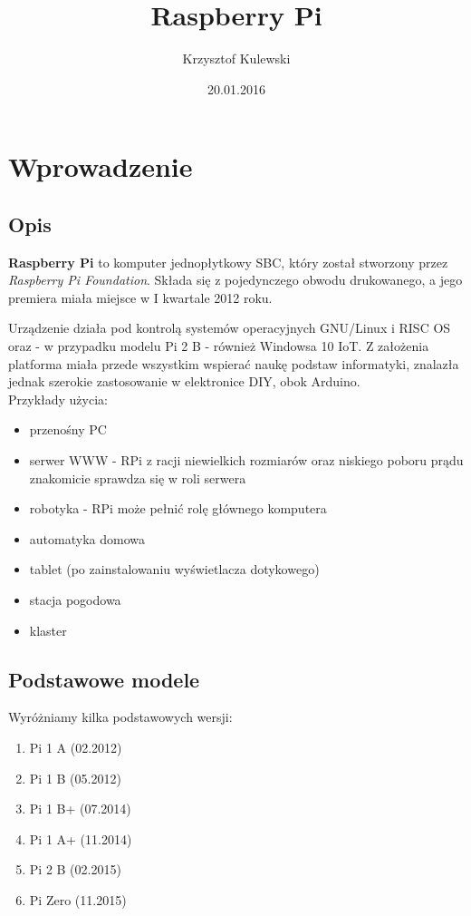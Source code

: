 \documentclass[titlepage]{article}
\author{Krzysztof Kulewski}
\title{Raspberry Pi}
\date{20.01.2016}
\begin{document}
\maketitle

\newpage

\tableofcontents

\newpage

\section{Wprowadzenie}
\subsection{Opis}
\textbf{Raspberry Pi} to komputer jednopłytkowy SBC, 
który został stworzony przez \textit{Raspberry Pi Foundation\cite{rpif}}.
Składa się z pojedynczego obwodu drukowanego, a jego premiera 
miała miejsce w I kwartale 2012 roku.

Urządzenie działa pod kontrolą systemów operacyjnych GNU/Linux i RISC OS oraz - w przypadku modelu Pi 2 B - również Windowsa 10 IoT.
Z założenia platforma miała przede wszystkim wspierać naukę 
podstaw informatyki, znalazła jednak szerokie zastosowanie w elektronice DIY, obok Arduino.
\\
Przykłady użycia:
\begin{itemize}
	\item przenośny PC
	\item serwer WWW - RPi z racji niewielkich rozmiarów oraz niskiego poboru prądu znakomicie sprawdza się w roli serwera
	\item robotyka - RPi może pełnić rolę głównego komputera
	\item automatyka domowa
	\item tablet (po zainstalowaniu wyświetlacza dotykowego)
	\item stacja pogodowa
	\item klaster
\end{itemize}
\subsection{Podstawowe modele}
Wyróżniamy kilka podstawowych wersji: 
\begin{enumerate}
	\item Pi 1 A (02.2012)
	\item Pi 1 B (05.2012)
	\item Pi 1 B+ (07.2014)
	\item Pi 1 A+ (11.2014)
	\item Pi 2 B (02.2015)
	\item Pi Zero (11.2015)
\end{enumerate}
\end{document}
